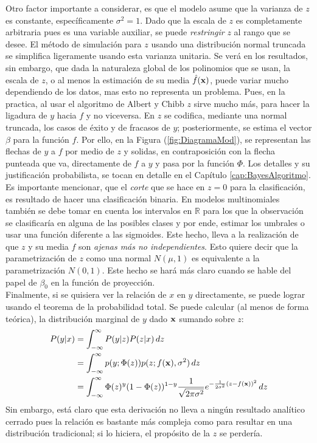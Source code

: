 \documentclass[../Main/Main.tex]{subfiles}
\begin{document}
Otro factor importante a considerar, es que el modelo asume que la varianza de $z$ es constante, específicamente $\sigma^2 = 1$. Dado que la escala de $z$ es completamente arbitraria pues es una variable auxiliar, se puede \textit{restringir} $z$ al rango que se desee. El método de simulación para $z$ usando una distribución normal truncada se simplifica ligeramente usando esta varianza unitaria. Se verá en los resultados, sin embargo, que dada la naturaleza global de los polinomios que se usan, la escala de $z$, o al menos la estimación de su media $\hat{f}(\mathbf{x})$, puede variar mucho dependiendo de los datos, mas esto no representa un problema. Pues, en la practica, al  usar el algoritmo de Albert y Chibb $z$ sirve mucho más, para hacer la ligadura de $y$ hacia $f$ y no viceversa. En $z$ se codifica, mediante una normal truncada, los casos de éxito y de fracasos de $y$; posteriormente, se estima el vector $\beta$ para la función $f$. Por ello, en la Figura (\ref{fig:DiagramaMod}), se representan las flechas de $y$ a $f$ por medio de $z$ y solidas, en contraposición con la flecha punteada que va, directamente de $f$ a $y$ y pasa por la función $\Phi$. Los detalles y su justificación probabilista, se tocan en detalle en el Capítulo \ref{cap:BayesAlgoritmo}.\\

Es importante mencionar, que el \textit{corte} que se hace en $z = 0$ para la clasificación, es resultado de hacer una clasificación binaria. En modelos multinomiales también se debe tomar en cuenta los intervalos en $\mathbb{R}$ para los que la observación se clasificaría en alguna de las posibles clases y por ende, estimar los umbrales o usar una función diferente a las sigmoides. Este hecho, lleva a la realización de que $z$ y su media $f$ son \textit{ajenas más no independientes}. Esto quiere decir que la parametrización de $z$ como una normal $N(\mu,1)$ es equivalente a la parametrización $N(0,1)$. Este hecho se hará más claro cuando se hable del papel de $\beta_0$ en la función de proyección. \\ 

Finalmente, si se quisiera ver la relación de $x$ en $y$ directamente, se puede lograr usando el teorema de la probabilidad total. Se puede calcular (al menos de forma teórica), la distribución marginal de $y$ dado $\mathbf{x}$ sumando sobre $z$:
\begin{align*}
P(y|x) 	&= \int_{-\infty}^\infty P(y|z)P(z|x)\, dz \\
		&= \int_{-\infty}^\infty p(y;\Phi(z))p(z;f(\mathbf{x}),\sigma^2)\, dz \\
		&= \int_{-\infty}^\infty \Phi(z)^y (1-\Phi(z))^{1-y}
		\dfrac{1}{\sqrt{2\pi\sigma^2}}e^{-\frac{1}{2\sigma^2}(z-f(\mathbf{x}))^2} \, dz
\end{align*}
Sin embargo, está claro que esta derivación no lleva a ningún resultado analítico cerrado pues la relación es bastante más compleja como para resultar en una distribución  tradicional; si lo hiciera, el propósito de la $z$ se perdería.\\
\end{document}
